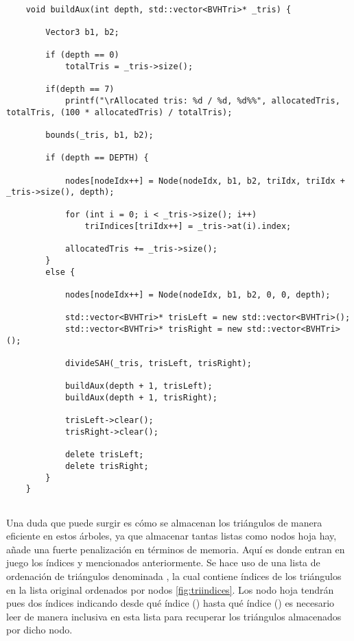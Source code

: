 \begin{minipage}[c]{0.95\textwidth}
\begin{lstlisting}[label={cod:generatebvh}, caption={Generación recursiva del árbol BVH}]
	
	void buildAux(int depth, std::vector<BVHTri>* _tris) {

		Vector3 b1, b2;

		if (depth == 0)
			totalTris = _tris->size();

		if(depth == 7)
			printf("\rAllocated tris: %d / %d, %d%%", allocatedTris, totalTris, (100 * allocatedTris) / totalTris);

		bounds(_tris, b1, b2);

		if (depth == DEPTH) {

			nodes[nodeIdx++] = Node(nodeIdx, b1, b2, triIdx, triIdx + _tris->size(), depth);

			for (int i = 0; i < _tris->size(); i++)
				triIndices[triIdx++] = _tris->at(i).index;

			allocatedTris += _tris->size();
		}
		else {

			nodes[nodeIdx++] = Node(nodeIdx, b1, b2, 0, 0, depth);

			std::vector<BVHTri>* trisLeft = new std::vector<BVHTri>();
			std::vector<BVHTri>* trisRight = new std::vector<BVHTri>();

			divideSAH(_tris, trisLeft, trisRight);

			buildAux(depth + 1, trisLeft);
			buildAux(depth + 1, trisRight);

			trisLeft->clear();
			trisRight->clear();

			delete trisLeft;
			delete trisRight;
		}
	}
	
\end{lstlisting}
\end{minipage}

Una duda que puede surgir es cómo se almacenan los triángulos de manera eficiente en estos árboles, ya que almacenar tantas listas como nodos hoja hay, añade una fuerte penalización en términos de memoria. Aquí es donde entran en juego los índices  y  mencionados anteriormente. Se hace uso de una lista de ordenación de triángulos denominada , la cual contiene índices de los triángulos en la lista original ordenados por nodos \autoref{fig:triindices}. Los nodo hoja tendrán pues dos índices indicando desde qué índice () hasta qué índice () es necesario leer de manera inclusiva en esta lista para recuperar los triángulos almacenados por dicho nodo.

